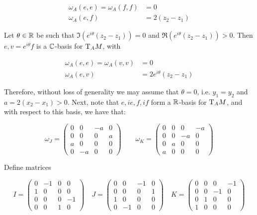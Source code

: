 \documentclass{article}
\begin{document}
\begin{align*}
    \omega_A(e, e) = \omega_A(f, f) &= 0 \\
    \omega_A(e, f) &= 2(z_2 - z_1)
\end{align*}

Let \(\theta \in \mathbb{R}\) be such that \(\Im(e^{i\theta}(z_2 - z_1)) = 0\) and \(\Re(e^{i\theta}(z_2 - z_1)) > 0\). Then \(e, v = e^{i\theta}f\) is a \(\mathbb{C}\)-basis for \(\mathrm{T}_A M\), with

\begin{align*}
    \omega_A(e, e) = \omega_A(v, v) &= 0 \\
    \omega_A(e, v) &= 2e^{i\theta}(z_2 - z_1)
\end{align*}

Therefore, without loss of generality we may assume that \(\theta = 0\), i.e. \(y_1 = y_2\) and \(a = 2(x_2 - x_1) > 0\). Next, note that \(e, ie, f, if\) form a \(\mathbb{R}\)-basis for \(\mathrm{T}_A M\), and with respect to this basis, we have that:

\[\omega_J = \begin{pmatrix}
    0 & 0 & -a & 0 \\
    0 & 0 & 0 & a \\
    a & 0 & 0 & 0 \\
    0 & -a & 0 & 0
\end{pmatrix} \qquad \omega_K = \begin{pmatrix}
    0 & 0 & 0 & -a \\
    0 & 0 & -a & 0 \\
    0 & a & 0 & 0 \\
    a & 0 & 0 & 0
\end{pmatrix}\]

Define matrices

\[I = \begin{pmatrix}
    0 & -1 & 0 & 0 \\
    1 & 0 & 0 & 0 \\
    0 & 0 & 0 & -1 \\
    0 & 0 & 1 & 0
\end{pmatrix} \quad J = \begin{pmatrix}
    0 & 0 & -1 & 0 \\
    0 & 0 & 0 & 1 \\
    1 & 0 & 0 & 0 \\
    0 & -1 & 0 & 0
\end{pmatrix} \quad K = \begin{pmatrix}
    0 & 0 & 0 & -1 \\
    0 & 0 & -1 & 0 \\
    0 & 1 & 0 & 0 \\
    1 & 0 & 0 & 0
\end{pmatrix}\]
\end{document}
